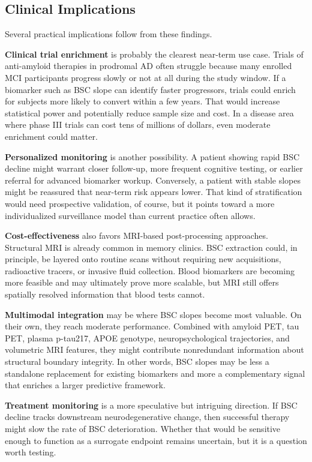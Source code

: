 \documentclass[blue]{ludusofficial}
\begin{document}
\subsection{Clinical Implications}

Several practical implications follow from these findings.

\textbf{Clinical trial enrichment} is probably the clearest near-term use case. Trials of anti-amyloid therapies in prodromal AD often struggle because many enrolled MCI participants progress slowly or not at all during the study window. If a biomarker such as BSC slope can identify faster progressors, trials could enrich for subjects more likely to convert within a few years. That would increase statistical power and potentially reduce sample size and cost. In a disease area where phase III trials can cost tens of millions of dollars, even moderate enrichment could matter.

\textbf{Personalized monitoring} is another possibility. A patient showing rapid BSC decline might warrant closer follow-up, more frequent cognitive testing, or earlier referral for advanced biomarker workup. Conversely, a patient with stable slopes might be reassured that near-term risk appears lower. That kind of stratification would need prospective validation, of course, but it points toward a more individualized surveillance model than current practice often allows.

\textbf{Cost-effectiveness} also favors MRI-based post-processing approaches. Structural MRI is already common in memory clinics. BSC extraction could, in principle, be layered onto routine scans without requiring new acquisitions, radioactive tracers, or invasive fluid collection. Blood biomarkers are becoming more feasible and may ultimately prove more scalable, but MRI still offers spatially resolved information that blood tests cannot.

\textbf{Multimodal integration} may be where BSC slopes become most valuable. On their own, they reach moderate performance. Combined with amyloid PET, tau PET, plasma p-tau217, APOE genotype, neuropsychological trajectories, and volumetric MRI features, they might contribute nonredundant information about structural boundary integrity. In other words, BSC slopes may be less a standalone replacement for existing biomarkers and more a complementary signal that enriches a larger predictive framework.

\textbf{Treatment monitoring} is a more speculative but intriguing direction. If BSC decline tracks downstream neurodegenerative change, then successful therapy might slow the rate of BSC deterioration. Whether that would be sensitive enough to function as a surrogate endpoint remains uncertain, but it is a question worth testing.
\end{document}
